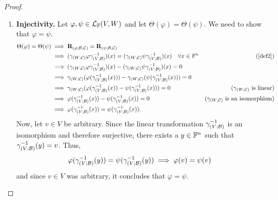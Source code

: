 \begin{proof}
\begin{enumerate}
        \item \textbf{Injectivity.} Let $\varphi, \psi \in \mathcal{L}_{\mathbb{F}}(V, W)$ and
        let $\Theta(\varphi) = \Theta(\psi)$. We need to show that
        $\varphi = \psi$.
        \begin{align*}
            \Theta(\varphi) = \Theta(\psi) &\implies \rep{\varphi} = \rep{\psi} \\
                                           &\implies (\compthr{\comap{W}{\C}}{\varphi}{\comap{V}{\B}^{-1}})(x) = (\compthr{\comap{W}{\C}}{\psi}{\comap{V}{\B}^{-1}})(x) \quad \forall x \in \F^{n}  &\text{(\cref{def2})} \\
                                           &\implies (\compthr{\comap{W}{\C}}{\varphi}{\comap{V}{\B}^{-1}})(x) - (\compthr{\comap{W}{\C}}{\psi}{\comap{V}{\B}^{-1}})(x) = 0 \\
                                           &\implies \comap{W}{\C}(\varphi(\comap{V}{\B}^{-1}(x))) - \comap{W}{\C}(\psi(\comap{V}{\B}^{-1}(x))) = 0 \\
                                           &\implies \comap{W}{\C}(\varphi(\comap{V}{\B}^{-1}(x)) - \psi(\comap{V}{\B}^{-1}(x))) = 0                                                                &\text{($\comap{W}{\C}$ is linear)} \\
                                           &\implies \varphi(\comap{V}{\B}^{-1}(x)) - \psi(\comap{V}{\B}^{-1}(x)) = 0                                                                               &\text{($\comap{W}{\C}$ is an isomorphism)} \\
                                           &\implies \varphi(\comap{V}{\B}^{-1}(x)) = \psi(\comap{V}{\B}^{-1}(x)).
        \end{align*}
        Now, let $v \in V$ be arbitrary. Since the linear transformation
        $\gamma_{(V; \mathcal{B})}^{-1}$ is an isomorphism and therefore surjective, there
        exists a $y \in \mathbb{F}^{n}$ such that $\gamma_{(V; \mathcal{B})}^{-1}(y) = v$. Thus,
        \[
            \varphi(\gamma_{(V; \mathcal{B})}^{-1}(y)) = \psi(\gamma_{(V; \mathcal{B})}^{-1}(y)) 
            \implies \varphi(v) = \psi(v)
        \]
        and since $v \in V$ was arbitrary, it concludes that $\varphi = \psi$.
        \vspace{0.2cm}
        

\end{enumerate}
\end{proof}
